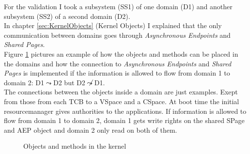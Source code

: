 For the validation I took a subsystem (SS1) of one domain (D1) and another subsystem (SS2) of a second domain (D2). \\
In chapter \ref{sec:KernelObjects} (Kernel Objects) I explained that the only communication between domains goes through \textit{Asynchronous Endpoints} and \textit{Shared Pages}. \\
Figure \ref{overview} pictures an example of how the objects and methods can be placed in the domains and how the connection to \textit{Asynchronous Endpoints} and \textit{Shared Pages} is implemented if the information is allowed to flow from domain 1 to domain 2: D1$\leadsto$D2 but D2$\not\leadsto$D1. \\ 
The connections between the objects inside a domain are just examples. Exept from those from each TCB to a VSpace and a CSpace. At boot time the initial resourcemanager gives authorities to the applications. If information is allowed to flow from domain 1 to domain 2, domain 1 gets write rights on the shared SPage and AEP object and domain 2 only read on both of them. 
\begin{flushleft}
\begin{figure}[H]
\caption{Objects and methods in the kernel}
\label{overview}
\end{figure}
\end{flushleft}
